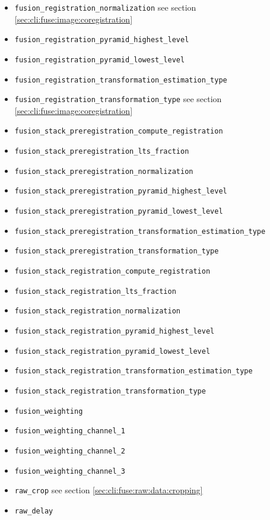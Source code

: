 \begin{itemize}
\item \texttt{fusion\_registration\_normalization} see section \ref{sec:cli:fuse:image:coregistration}
\item \texttt{fusion\_registration\_pyramid\_highest\_level}
\item \texttt{fusion\_registration\_pyramid\_lowest\_level}
\item \texttt{fusion\_registration\_transformation\_estimation\_type}
\item \texttt{fusion\_registration\_transformation\_type} see section \ref{sec:cli:fuse:image:coregistration}
\item \texttt{fusion\_stack\_preregistration\_compute\_registration}
\item \texttt{fusion\_stack\_preregistration\_lts\_fraction}
\item \texttt{fusion\_stack\_preregistration\_normalization}
\item \texttt{fusion\_stack\_preregistration\_pyramid\_highest\_level}
\item \texttt{fusion\_stack\_preregistration\_pyramid\_lowest\_level}
\item \texttt{fusion\_stack\_preregistration\_transformation\_estimation\_type}
\item \texttt{fusion\_stack\_preregistration\_transformation\_type}
\item \texttt{fusion\_stack\_registration\_compute\_registration}
\item \texttt{fusion\_stack\_registration\_lts\_fraction}
\item \texttt{fusion\_stack\_registration\_normalization}
\item \texttt{fusion\_stack\_registration\_pyramid\_highest\_level}
\item \texttt{fusion\_stack\_registration\_pyramid\_lowest\_level}
\item \texttt{fusion\_stack\_registration\_transformation\_estimation\_type}
\item \texttt{fusion\_stack\_registration\_transformation\_type}
\item \texttt{fusion\_weighting}
\item \texttt{fusion\_weighting\_channel\_1}
\item \texttt{fusion\_weighting\_channel\_2}
\item \texttt{fusion\_weighting\_channel\_3}
\item \texttt{raw\_crop} see section \ref{sec:cli:fuse:raw:data:cropping}
\item \texttt{raw\_delay}

\end{itemize}
